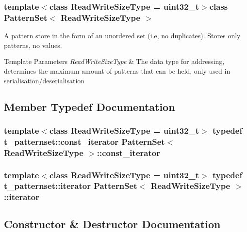 \subsubsection*{template$<$class Read\+Write\+Size\+Type = uint32\+\_\+t$>$class Pattern\+Set$<$ Read\+Write\+Size\+Type $>$}

A pattern store in the form of an unordered set (i.\+e, no duplicates). Stores only patterns, no values. 


\begin{DoxyTemplParams}{Template Parameters}
{\em Read\+Write\+Size\+Type} & The data type for addressing, determines the maximum amount of patterns that can be held, only used in serialisation/deserialisation \\
\hline
\end{DoxyTemplParams}


\subsection{Member Typedef Documentation}
\hypertarget{classPatternSet_a5d419991ea0abb0fbc4a2282574b1b8c}{}
\subsubsection[{const\+\_\+iterator}]{\setlength{\rightskip}{0pt plus 5cm}template$<$class Read\+Write\+Size\+Type = uint32\+\_\+t$>$ typedef t\+\_\+patternset\+::const\+\_\+iterator {\bf Pattern\+Set}$<$ Read\+Write\+Size\+Type $>$\+::{\bf const\+\_\+iterator}}\label{classPatternSet_a5d419991ea0abb0fbc4a2282574b1b8c}
\hypertarget{classPatternSet_a18b78ea966c57db2373741291ba610f3}{}
\subsubsection[{iterator}]{\setlength{\rightskip}{0pt plus 5cm}template$<$class Read\+Write\+Size\+Type = uint32\+\_\+t$>$ typedef t\+\_\+patternset\+::iterator {\bf Pattern\+Set}$<$ Read\+Write\+Size\+Type $>$\+::{\bf iterator}}\label{classPatternSet_a18b78ea966c57db2373741291ba610f3}


\subsection{Constructor \& Destructor Documentation}
\hypertarget{classPatternSet_a8cf2b4c7f096c7a3a7d17342c0153154}{}
